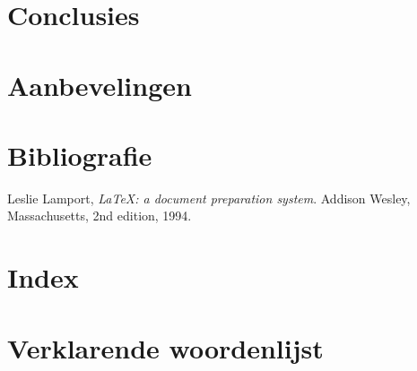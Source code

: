 \documentclass[twoside,openright,parskip]{scrreprt}
\begin{document}
\lipsum

\chapter{Conclusies}

\lipsum

\chapter{Aanbevelingen}

\lipsum

\chapter{Bibliografie}

\begin{thebibliography}{9999}

  Leslie Lamport,
  \emph{\LaTeX: a document preparation system}.
  Addison Wesley, Massachusetts,
  2nd edition,
  1994.

\end{thebibliography}

\chapter{Index}

\printindex

\chapter{Verklarende woordenlijst}

\printglossaries
\end{document}
